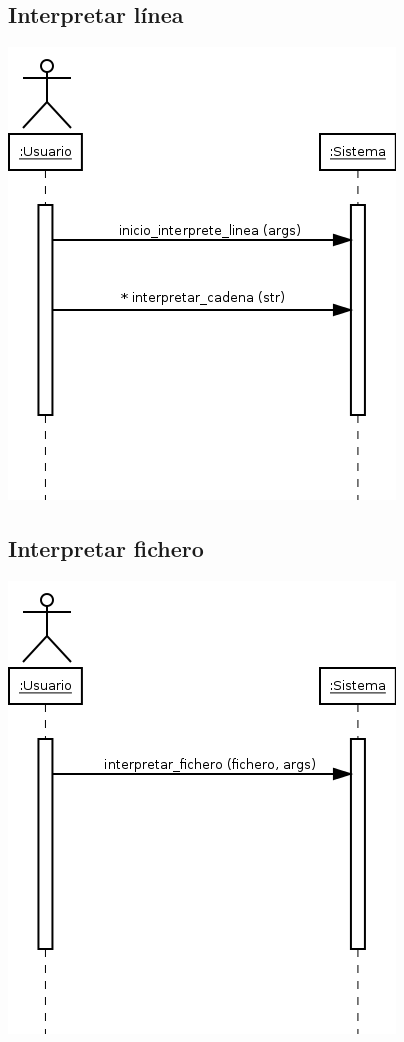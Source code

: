 \subsection{Interpretar línea}
\begin{center}
\includegraphics[scale=0.4]{interpretar_line.png} \\
\end{center}

\subsection{Interpretar fichero}
\begin{center}
\includegraphics[scale=0.4]{interpretar_file.png} \\
\end{center}

